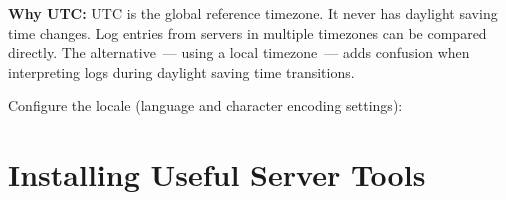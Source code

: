 \textbf{Why UTC:} UTC is the global reference timezone. It never has daylight saving time changes. Log entries from servers in multiple timezones can be compared directly. The alternative~--- using a local timezone~--- adds confusion when interpreting logs during daylight saving time transitions.

\begin{codebox}[short]

\begin{Shaded}
\begin{Highlighting}[]

\end{Highlighting}
\end{Shaded}

\end{codebox}

\noindent{}Configure the locale (language and character encoding settings):

\begin{codebox}[short]

\begin{Shaded}
\begin{Highlighting}[]

\end{Highlighting}
\end{Shaded}

\end{codebox}

\setcounter{section}{10}
\section{Installing Useful Server Tools}\label{21-system-setup:2111-installing-useful-server-tools}

